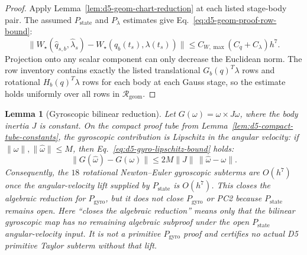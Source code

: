 \documentclass[preprint,12pt]{elsarticle}
\newtheorem{lemma}{Lemma}
\begin{document}
\begin{proof}
Apply Lemma~\ref{lem:d5-geom-chart-reduction} at each listed stage-body pair.
The assumed \(P_{\mathrm{state}}\) and \(P_{\lambda}\) estimates give
Eq.~\eqref{eq:d5-geom-proof-row-bound}:
\begin{equation}
\label{eq:d5-geom-proof-row-bound}
  \|W_\star(\widehat q_{s,b},\widehat\lambda_s)
        -W_\star(q_b(t_s),\lambda(t_s))\|
  \le C_{W,\max}(C_q+C_\lambda)h^7 .
\end{equation}
Projection onto any scalar component can only decrease the Euclidean norm.
The row inventory contains exactly the listed translational
\(G_b(q)^T\lambda\) rows and rotational \(H_b(q)^T\lambda\) rows for each
body at each Gauss stage, so the estimate holds uniformly over all rows in
\(\mathcal R_{\mathrm{geom}}\).
\end{proof}

\begin{lemma}[Gyroscopic bilinear reduction]
\label{lem:d5-gyro-bilinear-reduction}
Let \(G(\omega)=\omega\times J\omega\), where the body inertia \(J\) is
constant.  On the compact proof tube from
Lemma~\ref{lem:d5-compact-tube-constants}, the gyroscopic contribution is
Lipschitz in the angular velocity: if
\(\|\omega\|,\|\widehat\omega\|\le M\), then
Eq.~\eqref{eq:d5-gyro-lipschitz-bound} holds:
\begin{equation}
\label{eq:d5-gyro-lipschitz-bound}
  \|G(\widehat\omega)-G(\omega)\|
  \le 2M\|J\|\,\|\widehat\omega-\omega\|.
\end{equation}
Consequently, the \(18\) rotational Newton--Euler gyroscopic subterms are
\(O(h^7)\) once the angular-velocity lift supplied by
\(P_{\mathrm{state}}\) is \(O(h^7)\).  This closes the algebraic reduction
for \(P_{\mathrm{gyro}}\), but it does not close \(P_{\mathrm{gyro}}\) or
PC2 because \(P_{\mathrm{state}}\) remains open.  Here ``closes the
algebraic reduction'' means only that the bilinear gyroscopic map has no
remaining algebraic subproof under the open
\(P_{\mathrm{state}}\) angular-velocity input.  It is not a primitive
\(P_{\mathrm{gyro}}\) proof and certifies no actual D5 primitive Taylor
subterm without that lift.
\end{lemma}
\end{document}
